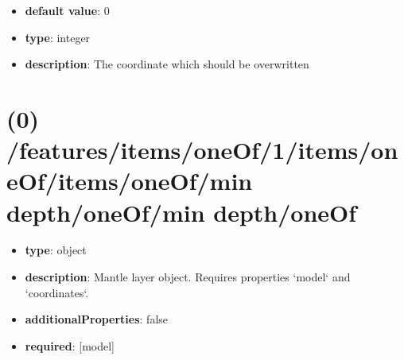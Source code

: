 \begin{itemize}[leftmargin=3em]\item {\bf default value}: 0
\item {\bf type}: integer
\item {\bf description}: The coordinate which should be overwritten
\end{itemize}\section{(0) /features/items/oneOf/1/items/oneOf/items/oneOf/min depth/oneOf/min depth/oneOf}
\begin{itemize}[leftmargin=0em]\item {\bf type}: object
\item {\bf description}: Mantle layer object. Requires properties `model` and `coordinates`.
\item {\bf additionalProperties}: false
\item {\bf required}: [model]\end{itemize}

